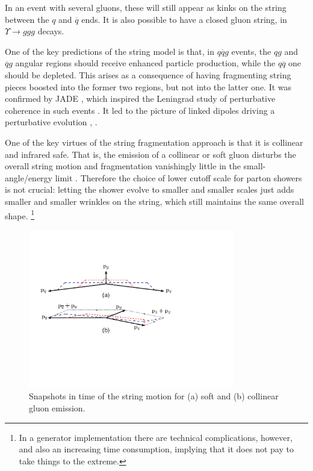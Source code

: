 In an event with several gluons, these will still appear as kinks on 
the string between the $q$ and $\overline{q}$ ends. It is also possible 
to have a closed gluon string, \eg in $\Upsilon \to ggg$ decays.

One of the key predictions of the string model is that, in
$q\overline{q}g$ events, the $qg$ and $\overline{q}g$ angular 
regions should receive enhanced particle production, while the 
$q\overline{q}$ one should be depleted. This arises as a consequence
of having fragmenting string pieces boosted into the former two
regions, but not into the latter one. It was confirmed by JADE 
\cite{Bartel:1983ii}, which inspired the Leningrad study of 
perturbative coherence in such events \cite{Azimov:1986sf}. 
It led to the picture of linked dipoles driving a 
perturbative evolution \cite{Gustafson:1986db,Gustafson:1987rq}, 
.  

One of the key virtues of the string fragmentation approach is that it
is collinear and infrared safe. That is, the emission of a collinear or 
soft gluon disturbs the overall string motion and fragmentation 
vanishingly little in the small-angle/energy limit 
\cite{Sjostrand:1984ic}. Therefore the choice of lower cutoff scale 
for parton showers is not crucial: letting the shower evolve to 
smaller and smaller scales just adds smaller and smaller wrinkles 
on the string, which still maintains the same overall shape.%
\footnote{In a generator implementation there are technical 
complications, however, and also an increasing time consumption, 
implying that it does not pay to take things to the extreme.}

\begin{figure}
\hspace*{0.1\textwidth}
\includegraphics[width=0.8\textwidth]{hadronization/stringthree.pdf} 
\caption{Snapshots in time of the string motion for (a) soft and
(b) collinear gluon emission.
\label{fig:stringthree}}
\end{figure}


